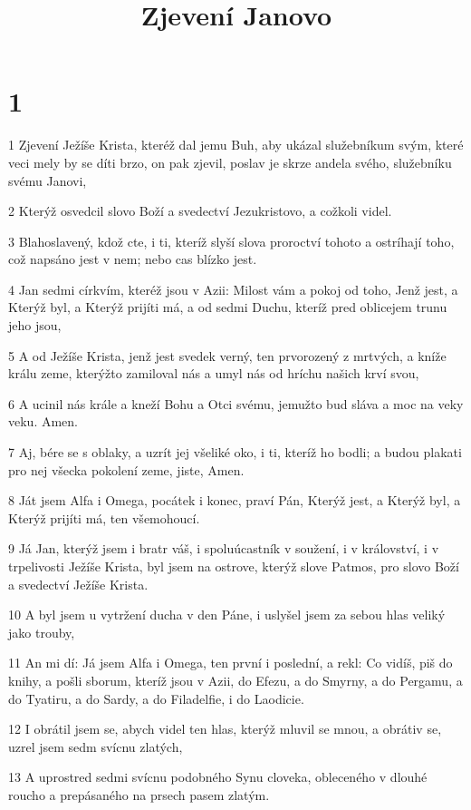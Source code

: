 

\title{Zjevení Janovo}

\chapter{1}

\par 1 Zjevení Ježíše Krista, kteréž dal jemu Buh, aby ukázal služebníkum svým, které veci mely by se díti brzo, on pak zjevil, poslav je skrze andela svého, služebníku svému Janovi,
\par 2 Kterýž osvedcil slovo Boží a svedectví Jezukristovo, a cožkoli videl.
\par 3 Blahoslavený, kdož cte, i ti, kteríž slyší slova proroctví tohoto a ostríhají toho, což napsáno jest v nem; nebo cas blízko jest.
\par 4 Jan sedmi církvím, kteréž jsou v Azii: Milost vám a pokoj od toho, Jenž jest, a Kterýž byl, a Kterýž prijíti má, a od sedmi Duchu, kteríž pred oblicejem trunu jeho jsou,
\par 5 A od Ježíše Krista, jenž jest svedek verný, ten prvorozený z mrtvých, a kníže králu zeme, kterýžto zamiloval nás a umyl nás od hríchu našich krví svou,
\par 6 A ucinil nás krále a kneží Bohu a Otci svému, jemužto bud sláva a moc na veky veku. Amen.
\par 7 Aj, bére se s oblaky, a uzrít jej všeliké oko, i ti, kteríž ho bodli; a budou plakati pro nej všecka pokolení zeme, jiste, Amen.
\par 8 Ját jsem Alfa i Omega, pocátek i konec, praví Pán, Kterýž jest, a Kterýž byl, a Kterýž prijíti má, ten všemohoucí.
\par 9 Já Jan, kterýž jsem i bratr váš, i spoluúcastník v soužení, i v království, i v trpelivosti Ježíše Krista, byl jsem na ostrove, kterýž slove Patmos, pro slovo Boží a svedectví Ježíše Krista.
\par 10 A byl jsem u vytržení ducha v den Páne, i uslyšel jsem za sebou hlas veliký jako trouby,
\par 11 An mi dí: Já jsem Alfa i Omega, ten první i poslední, a rekl: Co vidíš, piš do knihy, a pošli sborum, kteríž jsou v Azii, do Efezu, a do Smyrny, a do Pergamu, a do Tyatiru, a do Sardy, a do Filadelfie, i do Laodicie.
\par 12 I obrátil jsem se, abych videl ten hlas, kterýž mluvil se mnou, a obrátiv se, uzrel jsem sedm svícnu zlatých,
\par 13 A uprostred sedmi svícnu podobného Synu cloveka, obleceného v dlouhé roucho a prepásaného na prsech pasem zlatým.
